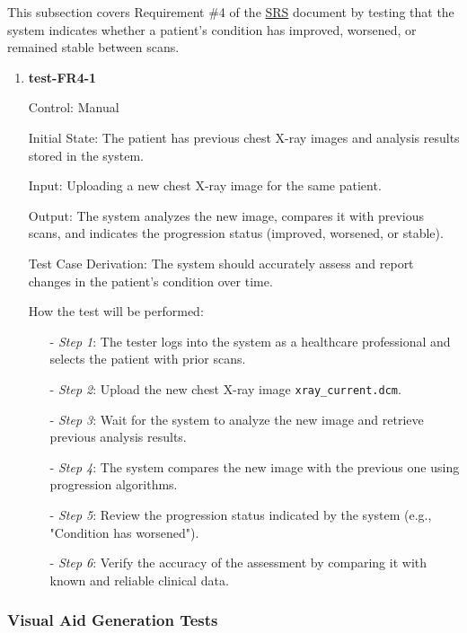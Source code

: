 \documentclass[12pt, titlepage]{article}
\begin{document}
This subsection covers Requirement \#4 of the \href{https://github.com/RezaJodeiri/CXR-Capstone/blob/main/docs/SRS/SRS.pdf}{SRS} \citep{SRS}
document by testing that the system indicates whether a patient's condition has improved, worsened, or remained stable between scans.

\begin{enumerate}

\item \textbf{test-FR4-1} \label{test-FR4-1}

Control: Manual

Initial State: The patient has previous chest X-ray images and analysis results stored in the system.

Input: Uploading a new chest X-ray image for the same patient.

Output: The system analyzes the new image, compares it with previous scans, and indicates the progression status (improved, worsened, or stable).

Test Case Derivation: The system should accurately assess and report changes in the patient's condition over time.

How the test will be performed:

\begin{itemize}
  \item[-] \textit{Step 1}: The tester logs into the system as a healthcare professional and selects the patient with prior scans.
  \item[-] \textit{Step 2}: Upload the new chest X-ray image \texttt{xray\_current.dcm}.
  \item[-] \textit{Step 3}: Wait for the system to analyze the new image and retrieve previous analysis results.
  \item[-] \textit{Step 4}: The system compares the new image with the previous one using progression algorithms.
  \item[-] \textit{Step 5}: Review the progression status indicated by the system (e.g., "Condition has worsened").
  \item[-] \textit{Step 6}: Verify the accuracy of the assessment by comparing it with known and reliable clinical data.
\end{itemize}

\end{enumerate}

\subsubsection{ Visual Aid Generation Tests}
\end{document}
